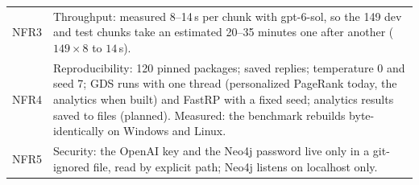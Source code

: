 \documentclass[10pt]{article}
\begin{document}
\begin{xltabular}{\textwidth}{@{}p{0.85cm}L@{}}
NFR3 & Throughput: measured 8--14\,s per chunk with gpt-6-sol, so the 149 dev and test chunks take an estimated 20--35 minutes one after another ($149 \times 8$ to $14$\,s).\\
NFR4 & Reproducibility: 120 pinned packages; saved replies; temperature 0 and seed 7; GDS runs with one thread (personalized PageRank today, the analytics when built) and FastRP with a fixed seed; analytics results saved to files (planned). Measured: the benchmark rebuilds byte-identically on Windows and Linux.\\
NFR5 & Security: the OpenAI key and the Neo4j password live only in a git-ignored  file, read by explicit path; Neo4j listens on localhost only.\\
\end{xltabular}
\endgroup
\end{document}
